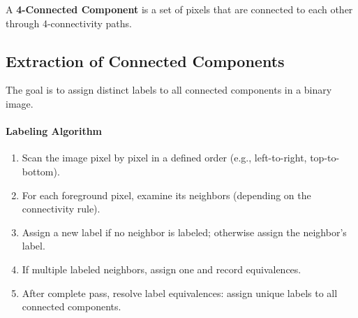 
\noindent A \textbf{4-Connected Component} is a set of pixels that are connected to each other through 4-connectivity paths. 

\subsection{Extraction of Connected Components}



\noindent The goal is to assign distinct labels to all connected components in a binary image.

\paragraph{Labeling Algorithm}
\begin{enumerate}
    \item Scan the image pixel by pixel in a defined order (e.g., left-to-right, top-to-bottom).
    \item For each foreground pixel, examine its neighbors (depending on the connectivity rule).
    \item Assign a new label if no neighbor is labeled; otherwise assign the neighbor’s label.
    \item If multiple labeled neighbors, assign one and record equivalences.
    \item After complete pass, resolve label equivalences: assign unique labels to all connected components.
\end{enumerate}

